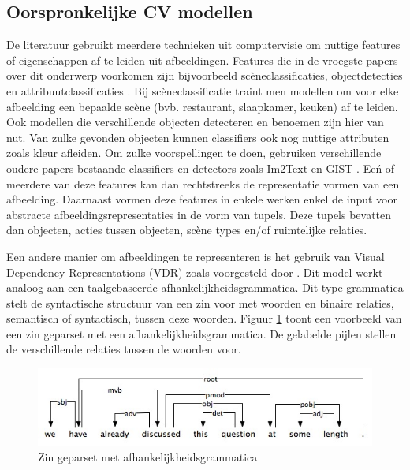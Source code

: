 \subsection{Oorspronkelijke CV modellen}
De literatuur gebruikt meerdere technieken uit computervisie om nuttige features of eigenschappen af te leiden uit afbeeldingen. Features die in de vroegste papers over dit onderwerp voorkomen zijn bijvoorbeeld sc\`eneclassificaties, objectdetecties en attribuutclassificaties \cite{Farhadi2010,Yang2011,Patterson2014}. Bij sc\`eneclassificatie traint men modellen om voor elke afbeelding een bepaalde sc\`ene (bvb. restaurant, slaapkamer, keuken) af te leiden. Ook modellen die verschillende objecten detecteren en benoemen zijn hier van nut. Van zulke gevonden objecten kunnen classifiers ook nog nuttige attributen zoals kleur afleiden. Om zulke voorspellingen te doen, gebruiken verschillende oudere papers bestaande classifiers en detectors zoals \cite{Felzenszwalb2008} Im2Text \cite{Ordonez2011} en GIST \cite{Oliva2006}. Ee\'n of meerdere van deze features kan dan rechtstreeks de representatie vormen van een afbeelding. Daarnaast vormen deze features in enkele werken \cite{Farhadi2010,Yang2011,Li2011,Mitchell2012} enkel de input voor abstracte afbeeldingsrepresentaties in de vorm van tupels. Deze tupels bevatten dan objecten, acties tussen objecten, sc\`ene types en/of ruimtelijke relaties.

Een andere manier om afbeeldingen te representeren is het gebruik van Visual Dependency Representations (VDR) zoals voorgesteld door \cite{Elliott2013}. Dit model werkt analoog aan een taalgebaseerde afhankelijkheidsgrammatica. Dit type grammatica stelt de syntactische structuur van een zin voor met woorden en binaire relaties, semantisch of syntactisch, tussen deze woorden\cite{Jurafsky:2009:SLP:1214993}. Figuur \ref{fig:dep_grammar} toont een voorbeeld van een zin geparset met een afhankelijkheidsgrammatica. De gelabelde pijlen stellen de verschillende relaties tussen de woorden voor. 

\begin{figure}[tb]
      \centering
      \includegraphics[width=\linewidth]{Images/dependencygrammar.jpg}
      \caption{Zin geparset met afhankelijkheidsgrammatica\cite{GasserNotes}}
      \label{fig:dep_grammar}
  \end{figure}  

